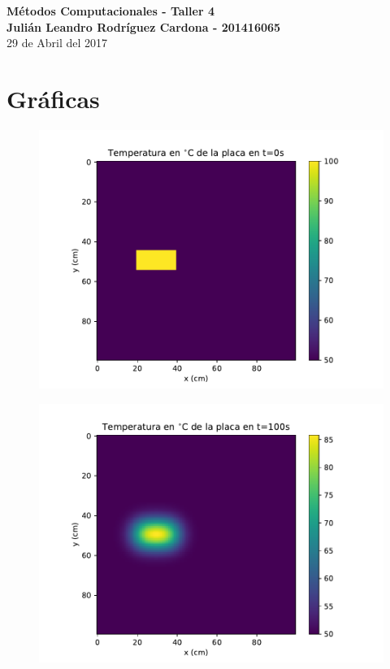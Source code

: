 \documentclass[12pt,letterpaper]{article}
\begin{document}
\begin{center}
{\Large \textbf{Métodos Computacionales - Taller 4}}\\
\vspace{0.3cm}
\textbf{Julián Leandro Rodríguez Cardona - 201416065}\\ \vspace{0.3cm}
29 de Abril del 2017
\end{center}

\section*{Gráficas}


\begin{figure}[h]
\includegraphics{f1_0.pdf}
\centering
\end{figure}

\begin{figure}[h]
\includegraphics{f1_100.pdf}
\centering
\end{figure}
\end{document}

